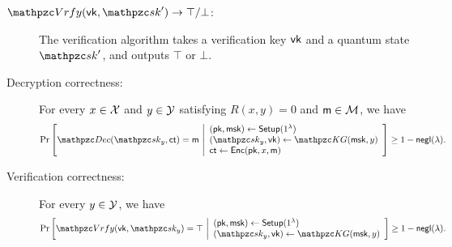 \begin{definition}
\begin{description}

\item[$\qVrfy(\vk,\qsk^\prime)\ra\top/\bot$:] The verification algorithm takes a verification key $\mathsf{vk}$ and a quantum state $\qsk^\prime$, and outputs $\top$ or $\bot$.


\item[Decryption correctness:]For every $x \in \mathcal{X}$ and $y \in \mathcal{Y}$
satisfying $R(x,y)=0$ and $\mathsf{m}\in\mathcal{M}$, we have
\begin{align}
\Pr\left[
\qDec(\qsk_y, \ct) \allowbreak = \msg
\ \middle |
\begin{array}{ll}
(\pk,\msk) \la \Setup(1^\secp)\\
(\qsk_y,\vk)\gets\qKG(\msk,y)\\
\ct\gets\Enc(\pk,x,\msg)
\end{array}
\right] 
\ge1-\negl(\secp).
\end{align}

\item[Verification correctness:] For every $y \in \mathcal{Y}$, we have 
\begin{align}
\Pr\left[
\qVrfy(\vk,\qsk_y)=\top
\ \middle |
\begin{array}{ll}
(\pk,\msk) \la \Setup(1^\secp)\\
(\qsk_y,\vk)\gets\qKG(\msk,y)\\
\end{array}
\right] 
\ge1-\negl(\secp).
\end{align}

\end{description}
\end{definition}

